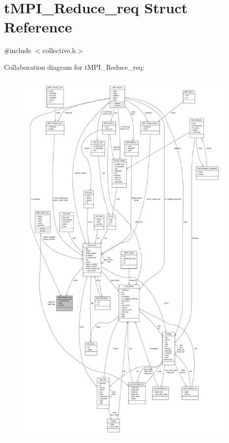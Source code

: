 \hypertarget{structtMPI__Reduce__req}{\section{t\-M\-P\-I\-\_\-\-Reduce\-\_\-req \-Struct \-Reference}
\label{structtMPI__Reduce__req}
}


{\ttfamily \#include $<$collective.\-h$>$}



\-Collaboration diagram for t\-M\-P\-I\-\_\-\-Reduce\-\_\-req\-:
\nopagebreak
\begin{figure}[H]
\begin{center}
\leavevmode
\includegraphics[height=550pt]{structtMPI__Reduce__req__coll__graph}
\end{center}
\end{figure}
